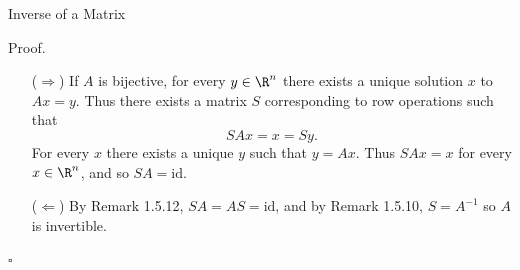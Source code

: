 \documentclass[smaller,hyperref={CJKbookmarks=true}]{beamer}
\begin{document}
\begin{frame}{Inverse of a Matrix}
\begin{spacing}{1}
\alert{Proof.}
\begin{itemize}
  \item[($\Rightarrow$)] If $A$ is bijective, for every $y\in\R^n$ there exists a unique solution $x$ to $Ax=y$. Thus there exists a matrix $S$ corresponding to row operations such that
      \[SAx=x=Sy.\]
      For every $x$ there exists a unique $y$ such that $y=Ax$. Thus $SAx=x$ for every $x\in\R^n$, and so $SA=\text{id}$.
  \item[($\Leftarrow$)] By Remark 1.5.12, $SA=AS=\text{id}$, and by Remark 1.5.10, $S=A^{-1}$ so $A$ is invertible.
\end{itemize}
\begin{flushright}
  $\square$
\end{flushright}
\end{spacing}
\end{frame}
\end{document}
